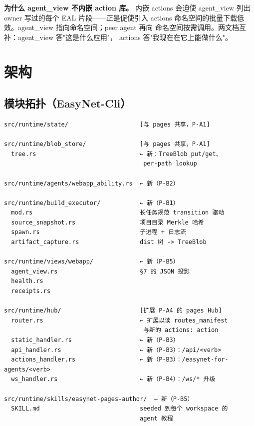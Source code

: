 \documentclass[11pt,a4paper]{article}
\theoremstyle{definition}
\begin{document}
\textbf{为什么 agent\_view 不内嵌 action 库。} 内嵌 actions 会迫使
agent\_view 列出 owner 写过的每个 EAL 片段——正是促使引入 actions
命名空间的批量下载低效。agent\_view 指向命名空间；peer agent 再向
命名空间按需调用。两文档互补：agent\_view 答"这是什么应用"，
actions 答"我现在在它上能做什么"。

\section{架构}
\label{sec:architecture}

\subsection{模块拓扑（EasyNet-Cli）}

\begin{lstlisting}
src/runtime/state/                    [与 pages 共享，P-A1]

src/runtime/blob_store/               [与 pages 共享，P-A1]
  tree.rs                             ← 新：TreeBlob put/get、
                                       per-path lookup

src/runtime/agents/webapp_ability.rs  ← 新（P-B2）

src/runtime/build_executor/           ← 新（P-B1）
  mod.rs                              长任务规范 transition 驱动
  source_snapshot.rs                  项目目录 Merkle 哈希
  spawn.rs                            子进程 + 日志流
  artifact_capture.rs                 dist 树 -> TreeBlob

src/runtime/views/webapp/             ← 新（P-B5）
  agent_view.rs                       §7 的 JSON 投影
  health.rs
  receipts.rs

src/runtime/hub/                      [扩展 P-A4 的 pages Hub]
  router.rs                           ← 扩展以读 routes_manifest
                                       与新的 actions: action
  static_handler.rs                   ← 新（P-B3）
  api_handler.rs                      ← 新（P-B3）：/api/<verb>
  actions_handler.rs                  ← 新（P-B3）：/easynet-for-agents/<verb>
  ws_handler.rs                       ← 新（P-B4）：/ws/* 升级

src/runtime/skills/easynet-pages-author/  ← 新（P-B5）
  SKILL.md                            seeded 到每个 workspace 的
                                      agent 教程
\end{lstlisting}
\end{document}
